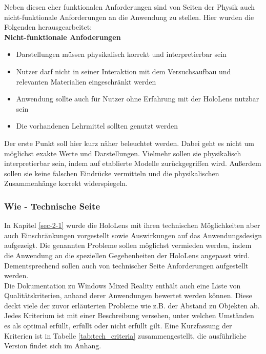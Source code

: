 Neben diesen eher funktionalen Anforderungen sind von Seiten der Physik auch nicht-funktionale Anforderungen an die Anwendung zu stellen. Hier wurden die Folgenden herausgearbeitet:\\[4px]
\textbf{Nicht-funktionale Anfoderungen}
\begin{itemize}[topsep=-2px]
	\setlength{\itemsep}{-5pt}
	\item Darstellungen müssen physikalisch korrekt und interpretierbar sein
	\item Nutzer darf nicht in seiner Interaktion mit dem Versuchsaufbau und relevanten Materialien eingeschränkt werden
	\item Anwendung sollte auch für Nutzer ohne Erfahrung mit der HoloLens nutzbar sein
	\item Die vorhandenen Lehrmittel sollten genutzt werden
\end{itemize}
\vspace{4px}
Der erste Punkt soll hier kurz näher beleuchtet werden. Dabei geht es nicht um möglichst exakte Werte und Darstellungen. Vielmehr sollen sie physikalisch interpretierbar sein, indem auf etablierte Modelle zurückgegriffen wird. Außerdem sollen sie keine falschen Eindrücke vermitteln und die physikalischen Zusammenhänge korrekt widerspiegeln.\\

\subsubsection{Wie - Technische Seite}
In Kapitel \ref{sec-2-1} wurde die HoloLens mit ihren technischen Möglichkeiten aber auch Einschränkungen vorgestellt sowie Auswirkungen auf das Anwendungsdesign aufgezeigt. Die genannten Probleme sollen möglichst vermieden werden, indem die Anwendung an die speziellen Gegebenheiten der HoloLens angepasst wird. Dementsprechend sollen auch von technischer Seite Anforderungen aufgestellt werden.\\

Die Dokumentation zu Windows Mixed Reality enthält auch eine Liste von Qualitätskriterien, anhand derer Anwendungen bewertet werden können. Diese deckt viele der zuvor erläuterten Probleme wie z.B. der Abstand zu Objekten ab. Jedes Kriterium ist mit einer Beschreibung versehen, unter welchen Umständen es als optimal erfüllt, erfüllt oder nicht erfüllt gilt. Eine Kurzfassung der Kriterien ist in Tabelle \ref{tab:tech_criteria} zusammengestellt, die ausführliche Version findet sich im Anhang.\\

